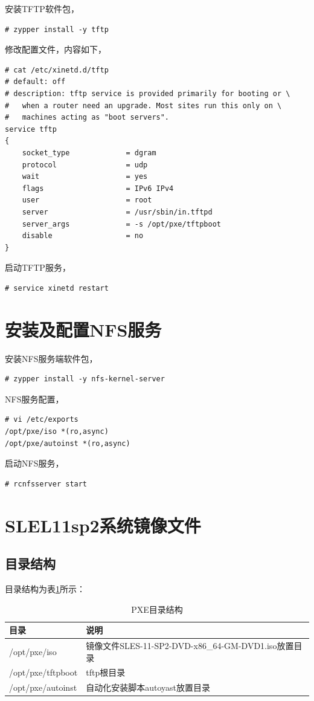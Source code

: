 安装TFTP软件包，
\begin{verbatim}
# zypper install -y tftp  
\end{verbatim}

修改配置文件，内容如下，
\begin{verbatim}
# cat /etc/xinetd.d/tftp 
# default: off
# description: tftp service is provided primarily for booting or \
#   when a router need an upgrade. Most sites run this only on \
#   machines acting as "boot servers".
service tftp
{
    socket_type             = dgram
    protocol                = udp
    wait                    = yes
    flags                   = IPv6 IPv4
    user                    = root
    server                  = /usr/sbin/in.tftpd
    server_args             = -s /opt/pxe/tftpboot
    disable                 = no 
}  
\end{verbatim}

启动TFTP服务，

\begin{verbatim}
# service xinetd restart  
\end{verbatim}

\section{安装及配置NFS服务}
\label{sec:InstallNFS}

安装NFS服务端软件包，
\begin{verbatim}
# zypper install -y nfs-kernel-server  
\end{verbatim}

NFS服务配置，
\begin{verbatim}
# vi /etc/exports
/opt/pxe/iso *(ro,async)  
/opt/pxe/autoinst *(ro,async)
\end{verbatim}

启动NFS服务，
\begin{verbatim}
# rcnfsserver start  
\end{verbatim}

\section{SLEL11sp2系统镜像文件}
\label{sles11sp2Image}

\subsection{目录结构}
目录结构为表\ref{PxeDir}所示：
\begin{table}[hbtp]
  \centering
    \begin{tabular}{ll}
      \toprule
      目录           & 说明 \\
      \midrule
      /opt/pxe/iso       & 镜像文件SLES-11-SP2-DVD-x86\_64-GM-DVD1.iso放置目录 \\
      /opt/pxe/tftpboot  & tftp根目录 \\
      /opt/pxe/autoinst  & 自动化安装脚本autoyast放置目录 \\
      \bottomrule
    \end{tabular}
    \caption{PXE目录结构}\label{PxeDir}
\end{table}

